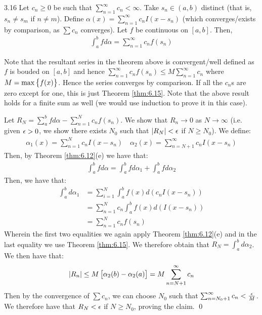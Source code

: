 \begin{theorem}{}{3.16}
    Let $c_n \geq 0$ be such that $\sum_{n=1}^\infty c_n < \infty$. Take $s_n \in (a, b)$ distinct (that is, $s_n \neq s_m$ if $n \neq m$). Define $\alpha(x) = \sum_{n=1}^\infty c_n I(x - s_n)$ (which converges/exists by comparison, as $\sum c_n$ converges). Let $f$ be continuous on $[a, b]$. Then,
    \begin{align*}
        \int_a^b f d\alpha = \sum_{n=1}^\infty c_nf(s_n)
    \end{align*}
\end{theorem}
\noindent Note that the resultant series in the theorem above is convergent/well defined as $f$ is bouded on $[a, b]$ and hence $\sum_{n=1}^\infty c_nf(s_n) \leq M\sum_{n=1}^\infty c_n$ where $M = \max\set{f(x)}$. Hence the series converges by comparison. If all the $c_n$s are zero except for one, this is just Theorem \ref{thm:6.15}. Note that the above result holds for a finite sum as well (we would use induction to prove it in this case).

\begin{nproof}
    Let $R_N = \sum_a^b fd\alpha - \sum_{n=1}^N c_nf(s_n)$. We show that $R_n \rightarrow 0$ as $N \rightarrow \infty$ (i.e. given $\epsilon > 0$, we show there exists $N_0$ such that $\abs{R_N} < \epsilon$ if $N \geq N_0$). We define:
    \begin{align*}
        \alpha_1(x) = \sum_{n=1}^N c_nI(x - s_n) \quad \alpha_2(x) = \sum_{n=N+1}^\infty c_n I(x - s_n)
    \end{align*}
    Then, by Theorem \ref{thm:6.12}(e) we have that:
    \begin{align*}
        \int_a^b fd\alpha = \int_a^b f d\alpha_1 + \int_a^b f d\alpha_2 
    \end{align*}
    Then, we have that:
    \begin{align*}
        \int_a^b d\alpha_1 &= \sum_{i=1}^N \int_a^b f(x)d(c_nI(x - s_n))
        \\ &= \sum_{n=1}^N c_n\int_a^b f(x)d(I(x - s_n))
        \\ &= \sum_{n=1}^Nc_nf(s_n)
    \end{align*}
    Wherein the first two equalities we again apply Theorem \ref{thm:6.12}(e) and in the last equality we use Theorem \ref{thm:6.15}. We therefore obtain that $R_N = \int_a^b d\alpha_2$. We then have that:
    \begin{align*}
        \abs{R_n} \leq M\left[\alpha_2(b) - \alpha_2(a)\right] = M\sum_{n=N+1}^{\infty} c_n
    \end{align*}
    Then by the convergence of $\sum c_n$, we can choose $N_0$ such that $\sum_{n=N_0+1}^\infty c_n < \frac{\epsilon}{M}$. We therefore have that $R_N < \epsilon$ if $N \geq N_0$, proving the claim. \qed
\end{nproof}


